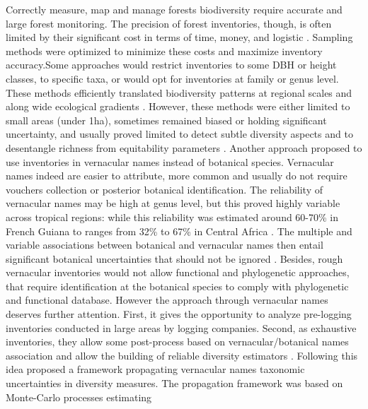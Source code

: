 \documentclass[fleqn,10pt]{ArtEcoFoG} %
\begin{document}
Correctly measure, map and manage forests biodiversity require accurate
and large forest monitoring. The precision of forest inventories,
though, is often limited by their significant cost in terms of time,
money, and logistic \citep{Feeley2011, Valencia2013}. Sampling methods
were optimized to minimize these costs and maximize inventory
accuracy.Some approaches would restrict inventories to some DBH or
height classes, to specific taxa, or would opt for inventories at family
or genus level. These methods efficiently translated biodiversity
patterns at regional scales and along wide ecological gradients
\citep{Steege2000, Higgins2004, Rejou-Mechain2011, Pos2014}. However,
these methods were either limited to small areas (under 1ha), sometimes
remained biased or holding significant uncertainty, and usually proved
limited to detect subtle diversity aspects and to desentangle richness
from equitability parameters
\citetext{\citealp{Phillips2003a}; \citealp{Valencia2013}; \citealp[
]{Guitet2014b}; \citealp{Vellend2008}; \citealp{Prance1994}}. Another
approach proposed to use inventories in vernacular names instead of
botanical species. Vernacular names indeed are easier to attribute, more
common and usually do not require vouchers collection or posterior
botanical identification. The reliability of vernacular names may be
high at genus level, but this proved highly variable across tropical
regions: while this reliability was estimated around 60-70\% in French
Guiana \citep{Hawes2012, Guitet2014b} to ranges from 32\% to 67\% in
Central Africa \citep{Rejou-Mechain2011}. The multiple and variable
associations between botanical and vernacular names then entail
significant botanical uncertainties that should not be ignored
\citep{Oldeman1968}. Besides, rough vernacular inventories would not
allow functional and phylogenetic approaches, that require
identification at the botanical species to comply with phylogenetic and
functional database. However the approach through vernacular names
deserves further attention. First, it gives the opportunity to analyze
pre-logging inventories conducted in large areas by logging companies.
Second, as exhaustive inventories, they allow some post-process based on
vernacular/botanical names association and allow the building of
reliable diversity estimators
\citep{TerSteege2006, Feldpausch2006, Rejou-Mechain2008, Rejou-Mechain2011}.
Following this idea \citet{Guitet2014b} proposed a framework propagating
vernacular names taxonomic uncertainties in diversity measures. The
propagation framework was based on Monte-Carlo processes estimating
\end{document}
